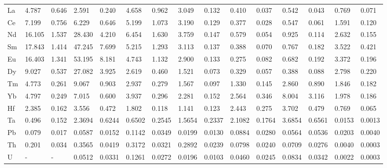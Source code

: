 \documentclass[review,authoryear,12pt]{elsarticle}
\begin{document}
\begin{table}[htpb]
\begin{adjustbox}{max width=\textwidth}
\begin{tabular}{@{}lllllllllllllll@{}}
La & 4.787  & 0.646  & 2.591  & 0.240  & 4.658  & 0.962  & 3.049  & 0.132  & 0.410  & 0.037  & 0.542          & 0.043          & 0.769            & 0.071           \\
Ce & 7.199  & 0.756  & 6.229  & 0.646  & 5.199  & 1.073  & 3.190  & 0.129  & 0.377  & 0.028  & 0.547          & 0.061          & 1.591            & 0.120           \\
Nd & 16.105 & 1.537  & 28.430 & 4.210  & 6.454  & 1.630  & 3.759  & 0.147  & 0.579  & 0.054  & 0.925          & 0.114          & 2.632            & 0.155           \\
Sm & 17.843 & 1.414  & 47.245 & 7.699  & 5.215  & 1.293  & 3.113  & 0.137  & 0.388  & 0.070  & 0.767          & 0.182          & 3.522            & 0.421           \\
Eu & 16.403 & 1.341  & 53.195 & 8.181  & 4.743  & 1.132  & 2.900  & 0.133  & 0.275  & 0.082  & 0.682          & 0.192          & 3.372            & 0.196           \\
Dy & 9.027  & 0.537  & 27.082 & 3.925  & 2.619  & 0.460  & 1.521  & 0.073  & 0.329  & 0.057  & 0.388          & 0.088          & 2.798            & 0.220           \\
Tm & 4.773  & 0.261  & 9.067  & 0.903  & 2.937  & 0.279  & 1.567  & 0.097  & 1.330  & 0.145  & 2.860          & 0.890          & 1.846            & 0.182           \\
Yb & 4.797  & 0.249  & 7.015  & 0.600  & 3.937  & 0.296  & 2.281  & 0.152  & 2.564  & 0.346  & 8.004          & 3.116          & 1.978            & 0.186           \\
Hf & 2.385  & 0.162  & 3.556  & 0.472  & 1.802  & 0.118  & 1.141  & 0.123  & 2.443  & 0.275  & 3.702          & 0.479          & 0.769            & 0.065           \\
Ta & 0.496  & 0.152  & 2.3694 & 0.6244 & 0.6502 & 0.2545 & 1.5654 & 0.2337 & 2.1082 & 0.1764 & 3.6854         & 0.6561         & 0.0153           & 0.0013          \\
Pb & 0.079  & 0.017  & 0.0587 & 0.0152 & 0.1142 & 0.0349 & 0.0199 & 0.0130 & 0.0884 & 0.0280 & 0.0564         & 0.0536         & 0.0203           & 0.0040          \\
Th & 0.201  & 0.034  & 0.3565 & 0.0419 & 0.3172 & 0.0321 & 0.2892 & 0.0239 & 0.0798 & 0.0240 & 0.0709         & 0.0276         & 0.0040           & 0.0003          \\
U  & -      & -      & 0.0512 & 0.0331 & 0.1261 & 0.0272 & 0.0196 & 0.0103 & 0.0460 & 0.0245 & 0.0834         & 0.0342         & 0.0022           & 0.0003          \\ \bottomrule
\end{tabular}
\end{adjustbox}
\end{table}
\end{document}
